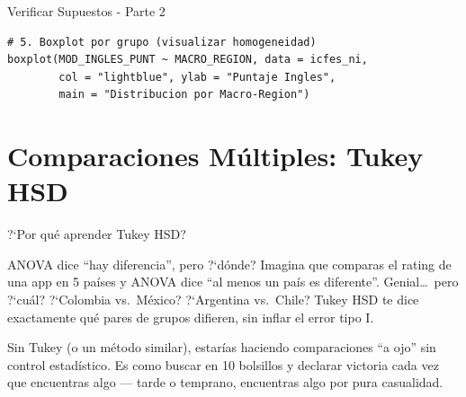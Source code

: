 \documentclass[aspectratio=169, 11pt]{beamer}
\begin{document}
\begin{frame}[fragile]{Verificar Supuestos - Parte 2}
\begin{lstlisting}
# 5. Boxplot por grupo (visualizar homogeneidad)
boxplot(MOD_INGLES_PUNT ~ MACRO_REGION, data = icfes_ni,
        col = "lightblue", ylab = "Puntaje Ingles",
        main = "Distribucion por Macro-Region")
\end{lstlisting}
\end{frame}

\section{Comparaciones Múltiples: Tukey HSD}

\begin{frame}{?`Por qu\'e aprender Tukey HSD?}
\small
\begin{exampleblock}{ANOVA dice ``hay diferencia'', pero ?`d\'onde?}
Imagina que comparas el rating de una app en 5 pa\'ises y ANOVA dice ``al menos un pa\'is es diferente''. Genial\ldots\ pero ?`cu\'al? ?`Colombia vs.\ M\'exico? ?`Argentina vs.\ Chile? Tukey HSD te dice \alert{exactamente} qu\'e pares de grupos difieren, sin inflar el error tipo I.
\end{exampleblock}

\vspace{0.2cm}
Sin Tukey (o un m\'etodo similar), estar\'ias haciendo comparaciones ``a ojo'' sin control estad\'istico. Es como buscar en 10 bolsillos y declarar victoria cada vez que encuentras algo --- tarde o temprano, encuentras algo por pura casualidad.
\end{frame}
\end{document}
